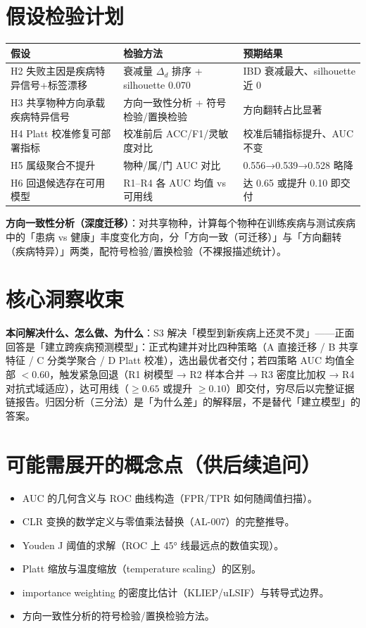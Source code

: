 \documentclass{internal-report}
\begin{document}
\section{假设检验计划}

\begin{center}
\begin{tabular}{p{}p{}p{}}
\toprule
假设 & 检验方法 & 预期结果 \\
\midrule
H2 失败主因是疾病特异信号+标签漂移 & 衰减量 $\Delta_d$ 排序 + silhouette 0.070 & IBD 衰减最大、silhouette 近 0 \\
H3 共享物种方向承载疾病特异信号 & 方向一致性分析 + 符号检验/置换检验 & 方向翻转占比显著 \\
H4 Platt 校准修复可部署指标 & 校准前后 ACC/F1/灵敏度对比 & 校准后辅指标提升、AUC 不变 \\
H5 属级聚合不提升 & 物种/属/门 AUC 对比 & 0.556→0.539→0.528 略降 \\
H6 回退候选存在可用模型 & R1--R4 各 AUC 均值 vs 可用线 & 达 0.65 或提升 0.10 即交付 \\
\bottomrule
\end{tabular}
\end{center}

\textbf{方向一致性分析（深度迁移）}：对共享物种，计算每个物种在训练疾病与测试疾病中的「患病 vs 健康」丰度变化方向，分「方向一致（可迁移）」与「方向翻转（疾病特异）」两类，配符号检验/置换检验（不裸报描述统计）。

\section{核心洞察收束}

\textbf{本问解决什么、怎么做、为什么}：S3 解决「模型到新疾病上还灵不灵」——正面回答是「建立跨疾病预测模型」：正式构建并对比四种策略（A 直接迁移 / B 共享特征 / C 分类学聚合 / D Platt 校准），选出最优者交付；若四策略 AUC 均值全部 $<0.60$，触发紧急回退（R1 树模型 → R2 样本合并 → R3 密度比加权 → R4 对抗式域适应），达可用线（$\ge0.65$ 或提升 $\ge0.10$）即交付，穷尽后以完整证据链报告。归因分析（三分法）是「为什么差」的解释层，不是替代「建立模型」的答案。

\section{可能需展开的概念点（供后续追问）}

\begin{itemize}
\item AUC 的几何含义与 ROC 曲线构造（FPR/TPR 如何随阈值扫描）。
\item CLR 变换的数学定义与零值乘法替换（AL-007）的完整推导。
\item Youden J 阈值的求解（ROC 上 45° 线最远点的数值实现）。
\item Platt 缩放与温度缩放（temperature scaling）的区别。
\item importance weighting 的密度比估计（KLIEP/uLSIF）与转导式边界。
\item 方向一致性分析的符号检验/置换检验方法。
\end{itemize}
\end{document}
